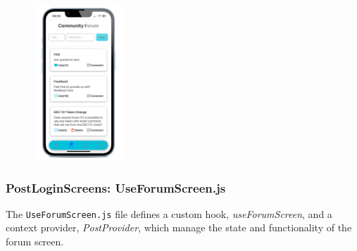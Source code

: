 \begin{figure}[!ht]
    \centering
    \includegraphics[width=0.3\textwidth]
    {LATEX/Appendices/Images/Software/Frontend/forum_screen_2.png}
    \label{fig:forum screen}
\end{figure} 

\subsubsection{PostLoginScreens: UseForumScreen.js}

The \texttt{UseForumScreen.js} file defines a custom hook, \textit{useForumScreen}, and a context provider, \textit{PostProvider}, which manage the state and functionality of the forum screen.

